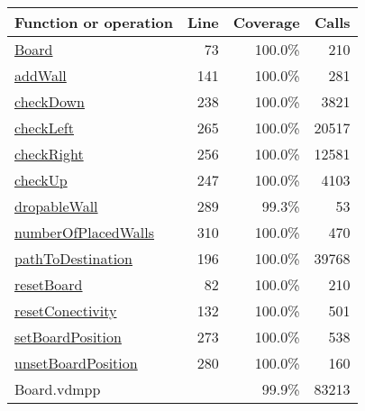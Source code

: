 \begin{longtable}{|l|r|r|r|}
\hline
Function or operation & Line & Coverage & Calls \\
\hline
\hline
\hyperref[Board:73]{Board} & 73&100.0\% & 210 \\
\hline
\hyperref[addWall:141]{addWall} & 141&100.0\% & 281 \\
\hline
\hyperref[checkDown:238]{checkDown} & 238&100.0\% & 3821 \\
\hline
\hyperref[checkLeft:265]{checkLeft} & 265&100.0\% & 20517 \\
\hline
\hyperref[checkRight:256]{checkRight} & 256&100.0\% & 12581 \\
\hline
\hyperref[checkUp:247]{checkUp} & 247&100.0\% & 4103 \\
\hline
\hyperref[dropableWall:289]{dropableWall} & 289&99.3\% & 53 \\
\hline
\hyperref[numberOfPlacedWalls:310]{numberOfPlacedWalls} & 310&100.0\% & 470 \\
\hline
\hyperref[pathToDestination:196]{pathToDestination} & 196&100.0\% & 39768 \\
\hline
\hyperref[resetBoard:82]{resetBoard} & 82&100.0\% & 210 \\
\hline
\hyperref[resetConectivity:132]{resetConectivity} & 132&100.0\% & 501 \\
\hline
\hyperref[setBoardPosition:273]{setBoardPosition} & 273&100.0\% & 538 \\
\hline
\hyperref[unsetBoardPosition:280]{unsetBoardPosition} & 280&100.0\% & 160 \\
\hline
\hline
Board.vdmpp & & 99.9\% & 83213 \\
\hline
\end{longtable}

